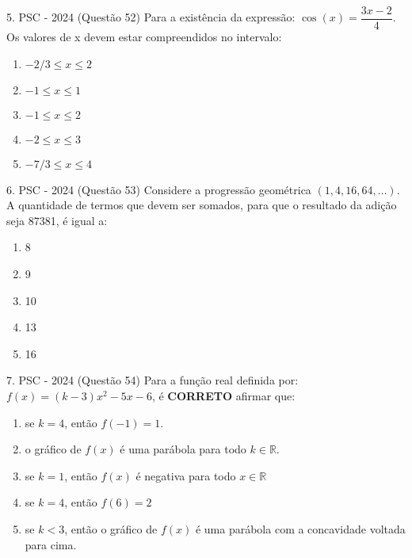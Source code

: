 \documentclass[aspectratio=169]{beamer}
\newif\ifusarcorvermelha
\newcommand{\vermelho}[1]{%
    \ifusarcorvermelha
        {\color{red}#1}%
    \else
        #1%
    \fi
}
\begin{document}
    \begin{frame}{5. PSC  - 2024 (Questão 52)}
       Para a existência da expressão: $\cos(x) = \dfrac{3x-2}{4}$. Os valores de x  devem estar compreendidos no intervalo:


         \begin{enumerate}[a]
                    \item \vermelho{$-{2}/{3} \leq x \leq 2$} %
                    \item $-1 \leq x \leq 1$
                    \item $-1 \leq x \leq 2$
                    \item $-2 \leq x \leq 3$
                    \item $-{7}/{3} \leq x \leq 4$
                \end{enumerate}        
    \end{frame}

    \begin{frame}{6. PSC  - 2024 (Questão 53)}
      Considere a progressão geométrica $(1, 4, 16, 64, … )$. A quantidade de termos que devem ser somados, para que o resultado da adição seja 87381, é igual a:


         \begin{enumerate}[a]
                \item 8
                \item \vermelho{9} %
                \item 10
                \item 13
                \item 16
        \end{enumerate}        
    
    \end{frame}

    \begin{frame}{7. PSC  - 2024 (Questão 54)}
      Para a função real definida por: $f(x)=(k-3)x^{2}-5x-6$, é \textbf{CORRETO} afirmar que:

         \begin{enumerate}[a]
                    \item se $k=4$, então $f(-1)=1.$
                    \item o gráfico de $f(x)$ é uma parábola para todo $k \in \mathbb{R}$.
                    \item \vermelho{se $k=1$, então $f(x)$ é negativa para todo $x \in \mathbb{R}$} %
                    \item se $k = 4$, então $f(6)=2$
                    \item se $k <3$, então o gráfico de $f(x)$ é uma parábola com a concavidade voltada para cima.
                \end{enumerate}        
    \end{frame}
\end{document}
